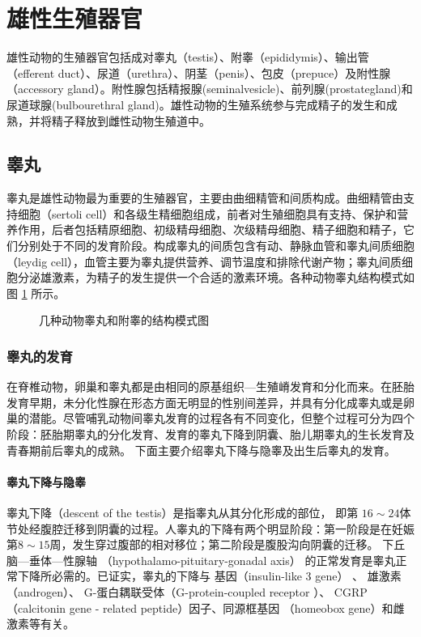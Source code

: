 \section{雄性生殖器官}

雄性动物的生殖器官包括成对睾丸（testis）、附睾（epididymis）、输出管（efferent duct）、尿道（urethra）、阴茎（penis）、包皮（prepuce）及附性腺（accessory gland）。附性腺包括精报腺(seminalvesicle)、前列腺(prostategland)和尿道球腺(bul­bourethral gland)。雄性动物的生殖系统参与完成精子的发生和成熟，并将精子释放到雌性动物生殖道中。

\subsection{睾丸}

睾丸是雄性动物最为重要的生殖器官，主要由曲细精管和间质构成。曲细精管由支持细胞（sertoli cell）和各级生精细胞组成，前者对生殖细胞具有支持、保护和营养作用，后者包括精原细胞、初级精母细胞、次级精母细胞、精子细胞和精子，它们分别处于不同的发育阶段。构成睾丸的间质包含有动、静脉血管和睾丸间质细胞（leydig cell），血管主要为睾丸提供营养、调节温度和排除代谢产物；睾丸间质细胞分泌雄激素，为精子的发生提供一个合适的激素环境。各种动物睾丸结构模式如图 \ref{figure_testis_of_several_animals} 所示。

\begin{figure}
\centering
\myFigurePlaceholder
\caption{几种动物睾丸和附睾的结构模式图}
\label{figure_testis_of_several_animals}
\end{figure}

\subsubsection{睾丸的发育}

在脊椎动物，卵巢和睾丸都是由相同的原基组织---生殖嵴发育和分化而来。在胚胎发育早期，未分化性腺在形态方面无明显的性别间差异，并具有分化成睾丸或是卵巢的潜能。尽管哺乳动物间睾丸发育的过程各有不同变化，但整个过程可分为四个阶段：胚胎期睾丸的分化发育、发育的睾丸下降到阴囊、胎儿期睾丸的生长发育及青春期前后睾丸的成熟。 下面主要介绍睾丸下降与隐睾及出生后睾丸的发育。

\paragraph{睾丸下降与隐睾}
睾丸下降（descent of the testis）是指睾丸从其分化形成的部位， 即第 $ 16 \sim 24 $体节处经腹腔迁移到阴囊的过程。人睾丸的下降有两个明显阶段：第一阶段是在妊娠第$ 8 \sim 15 $周，发生穿过腹部的相对移位；第二阶段是腹股沟向阴囊的迁移。 下丘脑---垂体---性腺轴 （hypothalamo-pituitary-gonadal axis） 的正常发育是睾丸正常下降所必需的。已证实，睾丸的下降与 基因（insulin-like 3 gene） 、 雄激素（androgen）、 G-蛋白耦联受体（G-protein-coupled receptor ）、 CGRP （calcitonin gene - related peptide）因子、同源框基因 （homeobox gene）和雌激素等有关。

